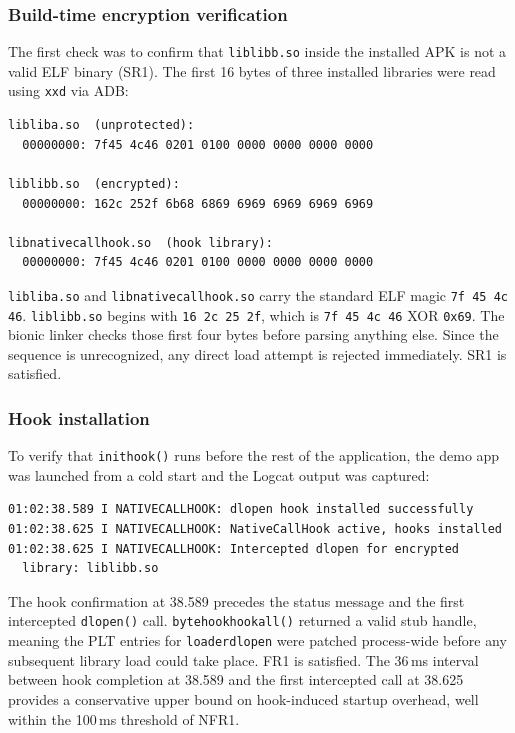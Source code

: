 \documentclass[11pt,a4paper]{report}
\renewcommand\_{{\textunderscore\allowbreak}}
\begin{document}
\subsubsection{Build-time encryption verification}

The first check was to confirm that \texttt{liblibb.so} inside the installed APK is not a valid ELF binary (SR1). The first 16 bytes of three installed libraries were read using \texttt{xxd} via ADB:

\begin{verbatim}
libliba.so  (unprotected):
  00000000: 7f45 4c46 0201 0100 0000 0000 0000 0000

liblibb.so  (encrypted):
  00000000: 162c 252f 6b68 6869 6969 6969 6969 6969

libnativecallhook.so  (hook library):
  00000000: 7f45 4c46 0201 0100 0000 0000 0000 0000
\end{verbatim}

\texttt{libliba.so} and \texttt{libnativecallhook.so} carry the standard ELF magic \texttt{7f 45 4c 46}. \texttt{liblibb.so} begins with \texttt{16 2c 25 2f}, which is \texttt{7f 45 4c 46} XOR \texttt{0x69}. The bionic linker checks those first four bytes before parsing anything else. Since the sequence is unrecognized, any direct load attempt is rejected immediately. SR1 is satisfied.

\subsubsection{Hook installation}

To verify that \texttt{init\_hook()} runs before the rest of the application, the demo app was launched from a cold start and the Logcat output was captured:

\begin{verbatim}
01:02:38.589 I NATIVECALLHOOK: dlopen hook installed successfully
01:02:38.625 I NATIVECALLHOOK: NativeCallHook active, hooks installed
01:02:38.625 I NATIVECALLHOOK: Intercepted dlopen for encrypted
  library: liblibb.so
\end{verbatim}

The hook confirmation at 38.589 precedes the status message and the first intercepted \texttt{dlopen()} call. \texttt{bytehook\_hook\_all()} returned a valid stub handle, meaning the PLT entries for \texttt{\_\_loader\_dlopen} were patched process-wide before any subsequent library load could take place. FR1 is satisfied. The 36\,ms interval between hook completion at 38.589 and the first intercepted call at 38.625 provides a conservative upper bound on hook-induced startup overhead, well within the 100\,ms threshold of NFR1.
\end{document}

